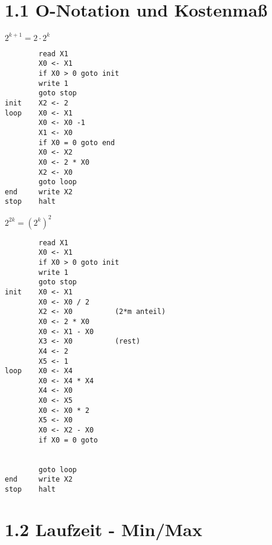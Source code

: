

\section*{1.1 O-Notation und Kostenmaß}

\textbf{$2^{k+1} = 2 \cdot 2^k$}

\begin{lstlisting}
        read X1
        X0 <- X1
        if X0 > 0 goto init
        write 1
        goto stop
init    X2 <- 2
loop    X0 <- X1
        X0 <- X0 -1
        X1 <- X0
        if X0 = 0 goto end
        X0 <- X2
        X0 <- 2 * X0
        X2 <- X0
        goto loop
end     write X2
stop    halt    
\end{lstlisting}

\textbf{$2^{2k} = (2^k)^2$}


\begin{lstlisting}
        read X1
        X0 <- X1
        if X0 > 0 goto init
        write 1
        goto stop
init    X0 <- X1
        X0 <- X0 / 2
        X2 <- X0          (2*m anteil)
        X0 <- 2 * X0
        X0 <- X1 - X0
        X3 <- X0          (rest)
        X4 <- 2 
        X5 <- 1
loop    X0 <- X4
        X0 <- X4 * X4
        X4 <- X0
        X0 <- X5
        X0 <- X0 * 2
        X5 <- X0
        X0 <- X2 - X0
        if X0 = 0 goto 
        
        
        goto loop
end     write X2
stop    halt    
\end{lstlisting}

\section*{1.2 Laufzeit - Min/Max}





